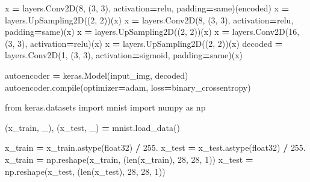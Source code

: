 \documentclass[
  a4paper,
  DIV=11,
  numbers=noendperiod]{scrreprt}
\newenvironment{Shaded}{\begin{snugshade}}{\end{snugshade}}
\newcommand{\BuiltInTok}[1]{#1}
\newcommand{\DecValTok}[1]{\textcolor[rgb]{0.00,0.00,0.81}{#1}}
\newcommand{\FloatTok}[1]{\textcolor[rgb]{0.00,0.00,0.81}{#1}}
\newcommand{\ImportTok}[1]{#1}
\newcommand{\NormalTok}[1]{#1}
\newcommand{\OperatorTok}[1]{\textcolor[rgb]{0.81,0.36,0.00}{\textbf{#1}}}
\newcommand{\StringTok}[1]{\textcolor[rgb]{0.31,0.60,0.02}{#1}}
\begin{document}
\begin{Shaded}
\begin{Highlighting}[numbers=left,,]
\NormalTok{x }\OperatorTok{=}\NormalTok{ layers.Conv2D(}\DecValTok{8}\NormalTok{, (}\DecValTok{3}\NormalTok{, }\DecValTok{3}\NormalTok{), activation}\OperatorTok{=}\StringTok{\textquotesingle{}relu\textquotesingle{}}\NormalTok{, padding}\OperatorTok{=}\StringTok{\textquotesingle{}same\textquotesingle{}}\NormalTok{)(encoded)}
\NormalTok{x }\OperatorTok{=}\NormalTok{ layers.UpSampling2D((}\DecValTok{2}\NormalTok{, }\DecValTok{2}\NormalTok{))(x)}
\NormalTok{x }\OperatorTok{=}\NormalTok{ layers.Conv2D(}\DecValTok{8}\NormalTok{, (}\DecValTok{3}\NormalTok{, }\DecValTok{3}\NormalTok{), activation}\OperatorTok{=}\StringTok{\textquotesingle{}relu\textquotesingle{}}\NormalTok{, padding}\OperatorTok{=}\StringTok{\textquotesingle{}same\textquotesingle{}}\NormalTok{)(x)}
\NormalTok{x }\OperatorTok{=}\NormalTok{ layers.UpSampling2D((}\DecValTok{2}\NormalTok{, }\DecValTok{2}\NormalTok{))(x)}
\NormalTok{x }\OperatorTok{=}\NormalTok{ layers.Conv2D(}\DecValTok{16}\NormalTok{, (}\DecValTok{3}\NormalTok{, }\DecValTok{3}\NormalTok{), activation}\OperatorTok{=}\StringTok{\textquotesingle{}relu\textquotesingle{}}\NormalTok{)(x)}
\NormalTok{x }\OperatorTok{=}\NormalTok{ layers.UpSampling2D((}\DecValTok{2}\NormalTok{, }\DecValTok{2}\NormalTok{))(x)}
\NormalTok{decoded }\OperatorTok{=}\NormalTok{ layers.Conv2D(}\DecValTok{1}\NormalTok{, (}\DecValTok{3}\NormalTok{, }\DecValTok{3}\NormalTok{), activation}\OperatorTok{=}\StringTok{\textquotesingle{}sigmoid\textquotesingle{}}\NormalTok{, padding}\OperatorTok{=}\StringTok{\textquotesingle{}same\textquotesingle{}}\NormalTok{)(x)}

\NormalTok{autoencoder }\OperatorTok{=}\NormalTok{ keras.Model(input\_img, decoded)}
\NormalTok{autoencoder.}\BuiltInTok{compile}\NormalTok{(optimizer}\OperatorTok{=}\StringTok{\textquotesingle{}adam\textquotesingle{}}\NormalTok{, loss}\OperatorTok{=}\StringTok{\textquotesingle{}binary\_crossentropy\textquotesingle{}}\NormalTok{)}

\ImportTok{from}\NormalTok{ keras.datasets }\ImportTok{import}\NormalTok{ mnist}
\ImportTok{import}\NormalTok{ numpy }\ImportTok{as}\NormalTok{ np}

\NormalTok{(x\_train, \_), (x\_test, \_) }\OperatorTok{=}\NormalTok{ mnist.load\_data()}

\NormalTok{x\_train }\OperatorTok{=}\NormalTok{ x\_train.astype(}\StringTok{\textquotesingle{}float32\textquotesingle{}}\NormalTok{) }\OperatorTok{/} \FloatTok{255.}
\NormalTok{x\_test }\OperatorTok{=}\NormalTok{ x\_test.astype(}\StringTok{\textquotesingle{}float32\textquotesingle{}}\NormalTok{) }\OperatorTok{/} \FloatTok{255.}
\NormalTok{x\_train }\OperatorTok{=}\NormalTok{ np.reshape(x\_train, (}\BuiltInTok{len}\NormalTok{(x\_train), }\DecValTok{28}\NormalTok{, }\DecValTok{28}\NormalTok{, }\DecValTok{1}\NormalTok{))}
\NormalTok{x\_test }\OperatorTok{=}\NormalTok{ np.reshape(x\_test, (}\BuiltInTok{len}\NormalTok{(x\_test), }\DecValTok{28}\NormalTok{, }\DecValTok{28}\NormalTok{, }\DecValTok{1}\NormalTok{))}


\end{Highlighting}
\end{Shaded}
\end{document}
